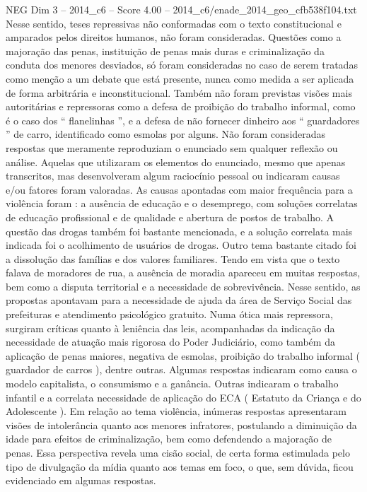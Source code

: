 \begin{textsample}{NEG Dim 3 – 2014\_c6 – Score 4.00 – 2014\_c6/enade\_2014\_geo\_cfb538f104.txt}
Nesse sentido, teses repressivas não conformadas com o texto constitucional e amparados pelos direitos humanos, não foram consideradas.
Questões como a majoração das penas, instituição de penas mais duras e criminalização da conduta dos menores desviados, só foram consideradas no caso de serem tratadas como menção a um debate que está presente, nunca como medida a ser aplicada de forma arbitrária e inconstitucional.
Também não foram previstas visões mais autoritárias e repressoras como a defesa de proibição do trabalho informal, como é o caso dos “ flanelinhas ”, e a defesa de não fornecer dinheiro aos “ guardadores ” de carro, identificado como esmolas por alguns.
Não foram consideradas respostas que meramente reproduziam o enunciado sem qualquer reflexão ou análise.
Aquelas que utilizaram os elementos do enunciado, mesmo que apenas transcritos, mas desenvolveram algum raciocínio pessoal ou indicaram causas e/ou fatores foram valoradas.
As causas apontadas com maior frequência para a violência foram : a ausência de educação e o desemprego, com soluções correlatas de educação profissional e de qualidade e abertura de postos de trabalho.
A questão das drogas também foi bastante mencionada, e a solução correlata mais indicada foi o acolhimento de usuários de drogas.
Outro tema bastante citado foi a dissolução das famílias e dos valores familiares.
Tendo em vista que o texto falava de moradores de rua, a ausência de moradia apareceu em muitas respostas, bem como a disputa territorial e a necessidade de sobrevivência.
Nesse sentido, as propostas apontavam para a necessidade de ajuda da área de Serviço Social das prefeituras e atendimento psicológico gratuito.
Numa ótica mais repressora, surgiram críticas quanto à leniência das leis, acompanhadas da indicação da necessidade de atuação mais rigorosa do Poder Judiciário, como também da aplicação de penas maiores, negativa de esmolas, proibição do trabalho informal ( guardador de carros ), dentre outras.
Algumas respostas indicaram como causa o modelo capitalista, o consumismo e a ganância.
Outras indicaram o trabalho infantil e a correlata necessidade de aplicação do ECA ( Estatuto da Criança e do Adolescente ).
Em relação ao tema violência, inúmeras respostas apresentaram visões de intolerância quanto aos menores infratores, postulando a diminuição da idade para efeitos de criminalização, bem como defendendo a majoração de penas.
Essa perspectiva revela uma cisão social, de certa forma estimulada pelo tipo de divulgação da mídia quanto aos temas em foco, o que, sem dúvida, ficou evidenciado em algumas respostas.

\end{textsample}
